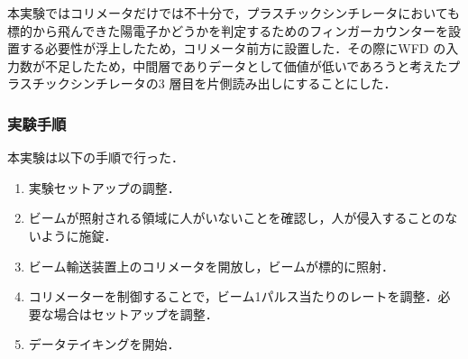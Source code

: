 本実験ではコリメータだけでは不十分で，プラスチックシンチレータにおいても標的から飛んできた陽電子かどうかを判定するためのフィンガーカウンターを設置する必要性が浮上したため，コリメータ前方に設置した．その際にWFD の入力数が不足したため，中間層でありデータとして価値が低いであろうと考えたプラスチックシンチレータの3 層目を片側読み出しにすることにした．

\subsubsection{実験手順}
本実験は以下の手順で行った．
\begin{enumerate}
\item 実験セットアップの調整．
\item ビームが照射される領域に人がいないことを確認し，人が侵入することのないように施錠．
\item ビーム輸送装置上のコリメータを開放し，ビームが標的に照射．
\item コリメーターを制御することで，ビーム1パルス当たりのレートを調整．必要な場合はセットアップを調整．
\item データテイキングを開始．
\end{enumerate}

%
